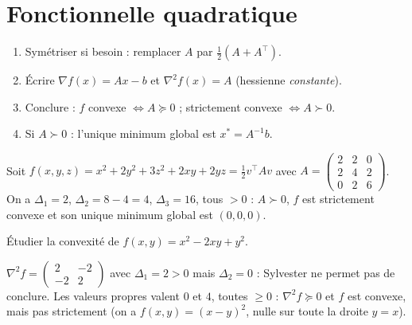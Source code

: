 \section{Fonctionnelle quadratique}

\begin{methode}[$f(x)=\tfrac12x^{\top}Ax-b^{\top}x+c$]
\begin{enumerate}[label=\textbf{Étape \arabic*.}]
  \item Symétriser si besoin : remplacer $A$ par $\frac12(A+A^{\top})$.
  \item Écrire $\nabla f(x)=Ax-b$ et $\nabla^2f(x)=A$ (hessienne \emph{constante}).
  \item Conclure : $f$ convexe $\iff A\succeq0$ ; strictement convexe $\iff A\succ0$.
  \item Si $A\succ0$ : l'unique minimum global est $x^*=A^{-1}b$.
\end{enumerate}
\end{methode}

\begin{exemple}
Soit $f(x,y,z)=x^2+2y^2+3z^2+2xy+2yz=\tfrac12v^{\top}Av$ avec $A=\begin{pmatrix}2&2&0\\2&4&2\\0&2&6\end{pmatrix}$. On a $\Delta_1=2$, $\Delta_2=8-4=4$, $\Delta_3=16$, tous $>0$ : $A\succ0$, $f$ est strictement convexe et son unique minimum global est $(0,0,0)$.
\end{exemple}

\begin{exercice}[Application]
Étudier la convexité de $f(x,y)=x^2-2xy+y^2$.
\begin{correction}
$\nabla^2f=\begin{pmatrix}2&-2\\-2&2\end{pmatrix}$ avec $\Delta_1=2>0$ mais $\Delta_2=0$ : Sylvester ne permet pas de conclure. Les valeurs propres valent $0$ et $4$, toutes $\ge0$ : $\nabla^2f\succeq0$ et $f$ est convexe, mais pas strictement (on a $f(x,y)=(x-y)^2$, nulle sur toute la droite $y=x$).
\end{correction}
\end{exercice}
